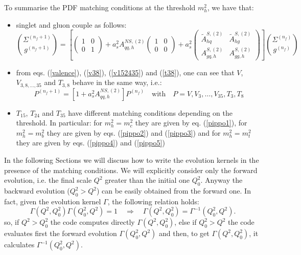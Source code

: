 \documentclass[10pt,a4paper]{article}
\begin{document}
To summarise the PDF matching conditions at the threshold $m_h^2$, we
have that:
\begin{itemize}
\item singlet and gluon couple as follows:
\begin{equation}\label{couple}
{\Sigma^{(n_f+1)} \choose g^{(n_f+1)}}=\left[\begin{pmatrix} 1 & 0 \\ 0 & 1\end{pmatrix}+a_s^2A_{qq,h}^{N\!S,(2)}\begin{pmatrix} 1 & 0 \\ 0 & 0\end{pmatrix}+a_s^2\begin{pmatrix} \tilde{A}^{S,(2)}_{hq} & \tilde{A}^{S,(2)}_{hg} \\A^{S,(2)}_{gq,h} & A_{gg,h}^{S,(2)}\end{pmatrix}\right]{\Sigma^{(n_f)} \choose g^{(n_f)}}
\end{equation}
\item from eqs. (\ref{valence}), (\ref{v38}), (\ref{v152435}) and (\ref{t38}), one can see that $V$, $V_{3,8,\dots,35}$ and $T_{3,8}$ behave in the same way, i.e.:
\begin{equation}\label{ciao}
P^{(n_f+1)}=[1+a_s^2A_{qq,h}^{N\!S,(2)}]P^{(n_f)}\quad\mbox{with}\quad P=V,V_3,\dots,V_{35},T_3,T_8
\end{equation}
\item $T_{15}$, $T_{24}$ and $T_{35}$ have different matching
  conditions depending on the threshold. In particular: for
  $m_h^2=m_c^2$ they are given by eq. (\ref{pippo1}), for
  $m_h^2=m_b^2$ they are given by eqs. (\ref{pippo2}) and
  (\ref{pippo3}) and for $m_h^2=m_t^2$ they are given by
  eqs. (\ref{pippo4}) and (\ref{pippo5})
\end{itemize}

In the following Sections we will discuss how to write the evolution
kernels in the presence of the matching conditions. We will explicitly
consider only the forward evolution, i.e. the final scale $Q^2$
greater than the initial one $Q_0^2$. Anyway the backward evolution
($Q_0^2>Q^2$) can be easily obtained from the forward one. In fact,
given the evolution kernel $\Gamma$, the following relation holds:
\begin{equation}
\Gamma(Q^2,Q_0^2)\Gamma(Q_0^2,Q^2)=1\quad\Longrightarrow\quad\Gamma(Q^2,Q_0^2)=\Gamma^{-1}(Q_0^2,Q^2).
\end{equation}
so, if $Q^2>Q_0^2$ the code computes directly $\Gamma(Q^2,Q_0^2)$, else if $Q^2_0>Q^2$ the code evaluates first the forward evolution $\Gamma(Q_0^2,Q^2)$ and then, to get $\Gamma(Q^2,Q_0^2)$, it calculates $\Gamma^{-1}(Q_0^2,Q^2)$.
\end{document}
